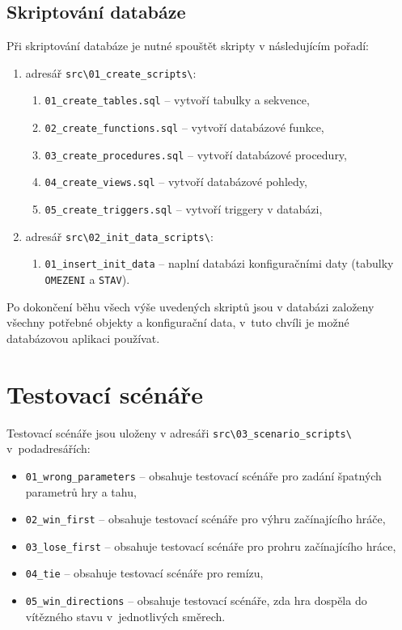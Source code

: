\documentclass[
11pt,
a4paper,
pdftex,
czech,
titlepage
]{report}
\begin{document}
\section{Skriptování databáze}
Při skriptování databáze je nutné spouštět skripty v následujícím pořadí:
\begin{enumerate}
    \item adresář \texttt{src\textbackslash01\_create\_scripts\textbackslash}:
    \begin{enumerate}
        \item \texttt{01\_create\_tables.sql} -- vytvoří tabulky a sekvence,
        \item \texttt{02\_create\_functions.sql} -- vytvoří databázové funkce,
        \item \texttt{03\_create\_procedures.sql} -- vytvoří databázové procedury,
        \item \texttt{04\_create\_views.sql} -- vytvoří databázové pohledy,
        \item \texttt{05\_create\_triggers.sql} -- vytvoří triggery v databázi,
    \end{enumerate}
    \item adresář \texttt{src\textbackslash02\_init\_data\_scripts\textbackslash}:
        \begin{enumerate}
        \item \texttt{01\_insert\_init\_data} -- naplní databázi konfiguračními daty (tabulky \texttt{OMEZENI} a \texttt{STAV}).
    \end{enumerate}
\end{enumerate}

Po dokončení běhu všech výše uvedených skriptů jsou v databázi založeny všechny potřebné objekty a konfigurační data, v~tuto chvíli je možné databázovou aplikaci používat.


\chapter{Testovací scénáře}\label{test_scenare}
Testovací scénáře jsou uloženy v adresáři \texttt{src\textbackslash03\_scenario\_scripts\textbackslash} v~podadresářích:
\begin{itemize}
    \item \texttt{01\_wrong\_parameters} -- obsahuje testovací scénáře pro zadání špatných parametrů hry a tahu,
    \item \texttt{02\_win\_first} -- obsahuje testovací scénáře pro výhru začínajícího hráče,
    \item \texttt{03\_lose\_first} -- obsahuje testovací scénáře pro prohru začínajícího hráce,
    \item \texttt{04\_tie} -- obsahuje testovací scénáře pro remízu,
    \item \texttt{05\_win\_directions} -- obsahuje testovací scénáře, zda hra dospěla do vítězného stavu v~jednotlivých směrech.
\end{itemize}
\end{document}
